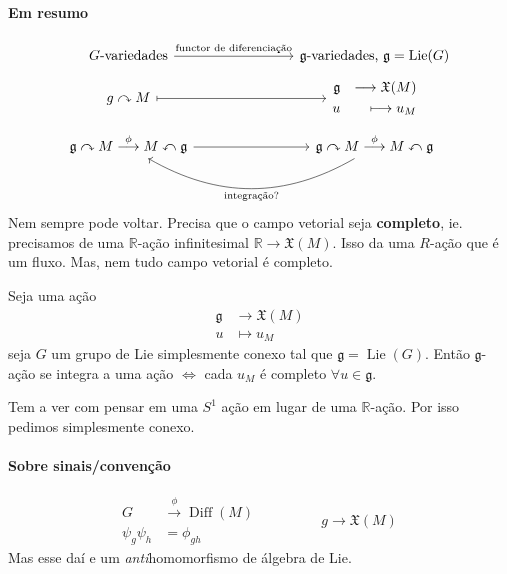 \paragraph{Em resumo}
\[\begin{tikzcd}[row sep =tiny]
G\text{-variedades} \arrow[rrr,"\text{functor de diferenciação}" ]&&&\mathfrak{g}\text{-variedades, }\mathfrak{g} =\operatorname{Lie}(G) \\ 
g\curvearrowright M\arrow[rrr,maps to]&&&\begin{aligned}
	\mathfrak{g} &\longrightarrow \mathfrak{X}(M) \\
	u &\longmapsto u_M
\end{aligned}\\
\mathfrak{g} \curvearrowright M\overset{\phi}{\longrightarrow}M\curvearrowleft \mathfrak{g}\arrow[rrr]&&&\mathfrak{g} \curvearrowright M\overset{\phi}{\longrightarrow}M\curvearrowleft \mathfrak{g}\arrow[lll,bend left,"\text{integração?}" ]
\end{tikzcd}\]
Nem sempre pode voltar. Precisa que o campo vetorial seja \textbf{completo}, ie. precisamos de uma $\mathbb{R}$-ação infinitesimal $\mathbb{R}\to \mathfrak{X}(M)$. Isso da uma $R$-ação que é um fluxo. Mas, nem tudo campo vetorial é completo.

\begin{thm}\leavevmode
	Seja uma ação 
	\begin{align*}
		\mathfrak{g} &\longrightarrow \mathfrak{X}(M) \\
		u &\longmapsto u_M
	\end{align*}
	seja $G$ um grupo de Lie simplesmente conexo tal que $\mathfrak{g} =\operatorname{Lie}(G)$. Então $\mathfrak{g}$-ação se integra a uma ação $\iff$ cada $u_M$  é completo $\forall u\in\mathfrak{g}$.
\end{thm}

\begin{remark}
	Tem a ver com pensar em uma $S^1$ ação em lugar de uma $\mathbb{R}$-ação. Por isso pedimos simplesmente conexo.
\end{remark}




\paragraph{Sobre sinais/convenção} 

\[\begin{aligned}
	G &\overset{\phi}{\longrightarrow}\operatorname{Diff}(M)  \\
	\psi_g\psi_h &=\phi_{gh} 
\end{aligned}\qquad \qquad \begin{aligned}
g \longrightarrow \mathfrak{X}(M)
\end{aligned}\]
Mas esse daí e um \textit{anti}homomorfismo de álgebra de Lie.

